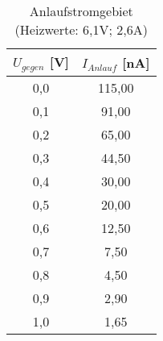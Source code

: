 \begin{table}[h]
	\begin{center}
		\begin{tabular}{cc}
			$U_{gegen}$ [V]&$I_{Anlauf}$ [nA] \\ \hline
			0,0&115,00\\
			0,1&91,00\\
			0,2&65,00\\
			0,3&44,50\\
			0,4&30,00\\
			0,5&20,00\\
			0,6&12,50\\
			0,7&7,50\\
			0,8&4,50\\
			0,9&2,90\\
			1,0&1,65
		\end{tabular}
		\caption{Anlaufstromgebiet (Heizwerte: 6,1V; 2,6A)}
		\label{tabcdata}
	\end{center}
\end{table}
